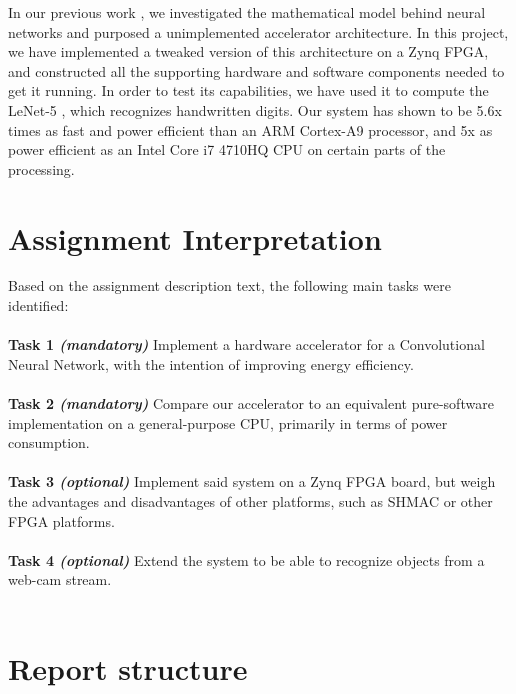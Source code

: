 In our previous work \cite{Halvorsen2014}, we investigated the mathematical model behind neural networks and purposed a unimplemented accelerator architecture. In this project, we have implemented a tweaked version of this architecture on a Zynq FPGA, and constructed all the supporting hardware and software components needed to get it running. In order to test its capabilities, we have used it to compute the LeNet-5 \cite{LeCun1998}, which recognizes handwritten digits. Our system has shown to be 5.6x times as fast and power efficient than an ARM Cortex-A9 processor, and 5x as power efficient as an Intel Core i7 4710HQ CPU on certain parts of the processing.


\section{Assignment Interpretation}

Based on the assignment description text, the following main tasks were
identified:\\ \hfil \\ \hfil
\textbf{Task 1 \textit{(mandatory)}} Implement a hardware accelerator for a Convolutional Neural Network, with the intention of improving energy efficiency.  \\ \hfil \\ \hfil
\textbf{Task 2 \textit{(mandatory)}} Compare our accelerator to an equivalent pure-software implementation on a general-purpose CPU, primarily in terms of power consumption.  \\ \hfil \\ \hfil
\textbf{Task 3 \textit{(optional)}} Implement said system on a  Zynq FPGA board, but weigh the advantages and disadvantages of other platforms, such as SHMAC or other FPGA platforms. \\ \hfil \\ \hfil
\textbf{Task 4 \textit{(optional)}} Extend the system to be able to recognize objects from a web-cam stream. \\ \hfil \\ \hfil


\section{Report structure}

